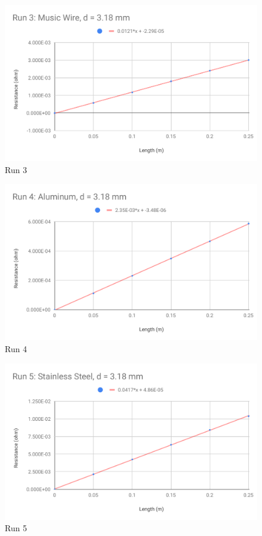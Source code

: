 \begin{figure}[ht]
	\centering
	\includegraphics[scale=0.74]{image/02-resistance/run3.pdf}
	\caption{Run 3}
	\label{figure.02.run.3}
\end{figure}
\begin{figure}[ht]
	\centering
	\includegraphics[scale=0.74]{image/02-resistance/run4.pdf}
	\caption{Run 4}
	\label{figure.02.run.4}
\end{figure}
\begin{figure}[ht]
	\centering
	\includegraphics[scale=0.74]{image/02-resistance/run5.pdf}
	\caption{Run 5}
	\label{figure.02.run.5}
\end{figure}

